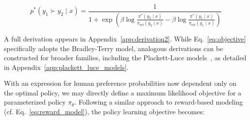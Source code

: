 \begin{equation}\label{eq:objective}
    p^*(y_1\succ y_2 \mid x)=\frac{1}{1 + \exp\left(\beta \log \frac{\pi^*(y_2\mid x)}{\pi_\text{ref}(y_2\mid x)} - \beta \log \frac{\pi^*(y_1\mid x)}{\pi_\text{ref}(y_1\mid x)}\right)}
\end{equation}

A full derivation appears in Appendix~\ref{app:derivation2}. While Eq.~\ref{eq:objective} specifically adopts the Bradley-Terry model, analogous derivations can be constructed for broader families, including the Plackett-Luce models~\citep{plackett1975analysis, luce2012individual}, as detailed in Appendix~\ref{app:plackett_luce_models}.

With an expression for human preference probabilities now dependent only on the optimal policy, we may directly define a maximum likelihood objective for a parameterized policy $\pi_\theta$. Following a similar approach to reward-based modeling (cf. Eq.~\ref{eq:reward_model}), the policy learning objective becomes:


